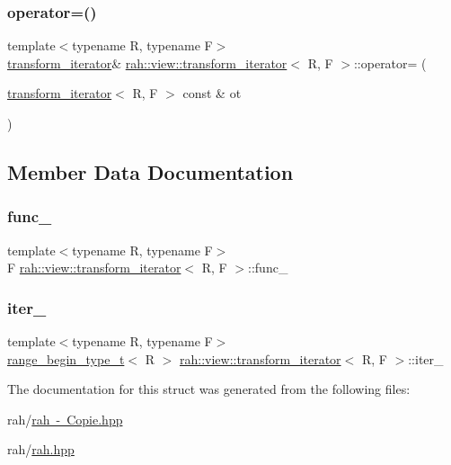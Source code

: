 \subsubsection{\texorpdfstring{operator=()}{operator=()}\hspace{0.1cm}{\footnotesize\ttfamily [2/2]}}
{\footnotesize\ttfamily template$<$typename R, typename F$>$ \\
\mbox{\hyperlink{structrah_1_1view_1_1transform__iterator}{transform\+\_\+iterator}}\& \mbox{\hyperlink{structrah_1_1view_1_1transform__iterator}{rah\+::view\+::transform\+\_\+iterator}}$<$ R, F $>$\+::operator= (\begin{DoxyParamCaption}\item[{\mbox{\hyperlink{structrah_1_1view_1_1transform__iterator}{transform\+\_\+iterator}}$<$ R, F $>$ const \&}]{ot }\end{DoxyParamCaption})\hspace{0.3cm}{\ttfamily [inline]}}



\subsection{Member Data Documentation}
\mbox{\label{structrah_1_1view_1_1transform__iterator_a02ac2e8035d0b7917ee44967069def0d}} 
\subsubsection{\texorpdfstring{func\_}{func\_}}
{\footnotesize\ttfamily template$<$typename R, typename F$>$ \\
F \mbox{\hyperlink{structrah_1_1view_1_1transform__iterator}{rah\+::view\+::transform\+\_\+iterator}}$<$ R, F $>$\+::func\+\_\+}

\mbox{\label{structrah_1_1view_1_1transform__iterator_a349798fe3a741068fd28e50387f39e80}} 
\subsubsection{\texorpdfstring{iter\_}{iter\_}}
{\footnotesize\ttfamily template$<$typename R, typename F$>$ \\
\mbox{\hyperlink{namespacerah_a28aff4eeddcece6be65ff0b956d32d4a}{range\+\_\+begin\+\_\+type\+\_\+t}}$<$ R $>$ \mbox{\hyperlink{structrah_1_1view_1_1transform__iterator}{rah\+::view\+::transform\+\_\+iterator}}$<$ R, F $>$\+::iter\+\_\+}



The documentation for this struct was generated from the following files\+:\begin{DoxyCompactItemize}
\item 
rah/\mbox{\hyperlink{rah_01-_01_copie_8hpp}{rah -\/ Copie.\+hpp}}\item 
rah/\mbox{\hyperlink{rah_8hpp}{rah.\+hpp}}\end{DoxyCompactItemize}
